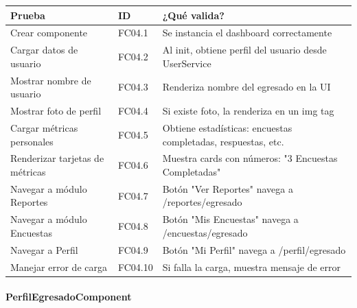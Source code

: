 \begin{table}[H]
\centering
\begin{tabular}{|l|l|p{6cm}|}
\hline
\textbf{Prueba} & \textbf{ID} & \textbf{¿Qué valida?} \\ \hline
Crear componente & FC04.1 & Se instancia el dashboard correctamente \\ \hline
Cargar datos de usuario & FC04.2 & Al init, obtiene perfil del usuario desde UserService \\ \hline
Mostrar nombre de usuario & FC04.3 & Renderiza nombre del egresado en la UI \\ \hline
Mostrar foto de perfil & FC04.4 & Si existe foto, la renderiza en un img tag \\ \hline
Cargar métricas personales & FC04.5 & Obtiene estadísticas: encuestas completadas, respuestas, etc. \\ \hline
Renderizar tarjetas de métricas & FC04.6 & Muestra cards con números: "3 Encuestas Completadas" \\ \hline
Navegar a módulo Reportes & FC04.7 & Botón "Ver Reportes" navega a /reportes/egresado \\ \hline
Navegar a módulo Encuestas & FC04.8 & Botón "Mis Encuestas" navega a /encuestas/egresado \\ \hline
Navegar a Perfil & FC04.9 & Botón "Mi Perfil" navega a /perfil/egresado \\ \hline
Manejar error de carga & FC04.10 & Si falla la carga, muestra mensaje de error \\ \hline
\end{tabular}
\end{table}

\paragraph{PerfilEgresadoComponent}

